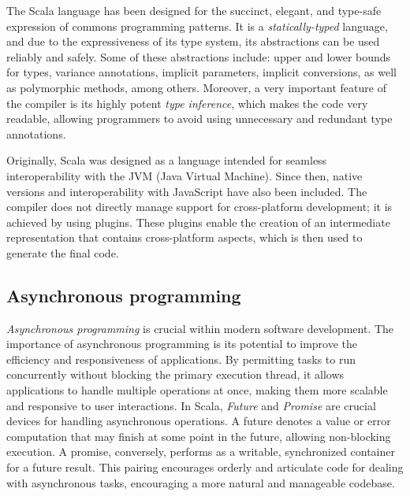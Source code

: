 \documentclass[12pt,a4paper,openright,twoside]{book}
\begin{document}
The Scala language has been designed for the succinct, elegant, and type-safe expression of commons programming patterns. 
    It is a \emph{statically-typed} language, and due to the expressiveness of its type system, its abstractions can be 
    used reliably and safely. Some of these abstractions include: upper and lower bounds for types, variance annotations, 
    implicit parameters, implicit conversions, as well as polymorphic methods, among others.
    Moreover, a very important feature of the compiler is its highly potent \emph{type inference}, 
    which makes the code very readable, allowing programmers to avoid using unnecessary and redundant type annotations.

Originally, Scala was designed as a language intended for seamless interoperability with the JVM (Java Virtual Machine). 
    Since then, native versions and interoperability with JavaScript have also been included. The compiler does not directly 
    manage support for cross-platform development; it is achieved by using plugins. These plugins enable the creation of an 
    intermediate representation that contains cross-platform aspects, which is then used to generate the final code.

\subsection*{Asynchronous programming}
\emph{Asynchronous programming} is crucial within modern software development. The importance of asynchronous programming is its 
    potential to improve the efficiency and responsiveness of applications. By permitting tasks to run concurrently without 
    blocking the primary execution thread, it allows applications to handle multiple operations at once, making them more 
    scalable and responsive to user interactions.
    In Scala, \emph{Future} and \emph{Promise} are crucial devices for handling asynchronous operations. 
    A future denotes a value or error computation that may finish at some point in the future, allowing non-blocking execution.
    A promise, conversely, performs as a writable, synchronized container for a future result. 
    This pairing encourages orderly and articulate code for dealing with asynchronous tasks, 
    encouraging a more natural and manageable codebase.
\end{document}
